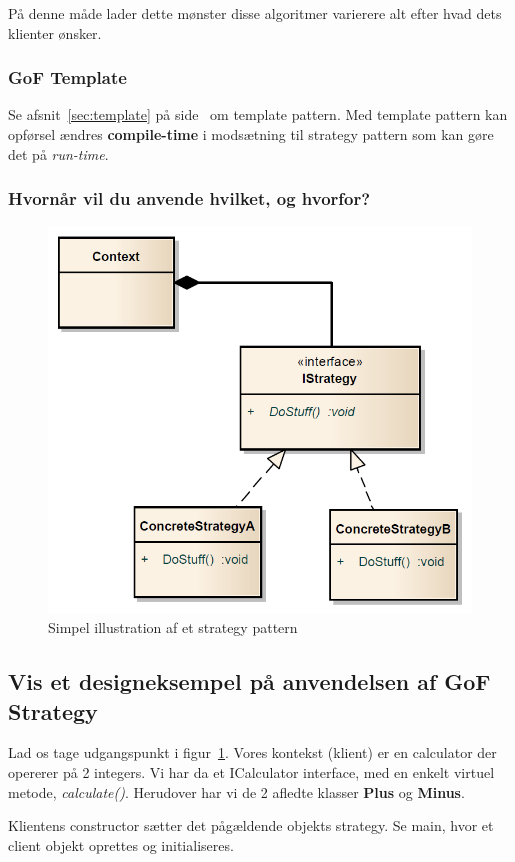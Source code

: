 På denne måde lader dette mønster disse algoritmer varierere alt efter hvad dets klienter ønsker.

\subsubsection{GoF Template}
Se afsnit~\ref{sec:template} på side~\pageref{sec:template} om template pattern. Med template pattern kan opførsel ændres \textbf{compile-time} i modsætning til strategy pattern som kan gøre det på \textit{run-time}.

\subsubsection{Hvornår vil du anvende hvilket, og hvorfor?}
\derp

\begin{figure}[h]
	\centering
	\includegraphics[width=0.6\linewidth]{figs/strategyPattern.PNG}
	\caption[UML for et strategy pattern]{Simpel illustration af et strategy pattern}
	\label{fig:strategyPattern}
\end{figure}

\subsection{Vis et designeksempel på anvendelsen af GoF Strategy}

Lad os tage udgangspunkt i figur~\ref{fig:strategyPattern}. Vores kontekst (klient) er en calculator der opererer på 2 integers.
Vi har da et ICalculator interface, med en enkelt virtuel metode, \textit{calculate()}.
Herudover har vi de 2 afledte klasser \textbf{Plus} og \textbf{Minus}.

Klientens constructor sætter det pågældende objekts strategy. Se main, hvor et client objekt oprettes og initialiseres.

